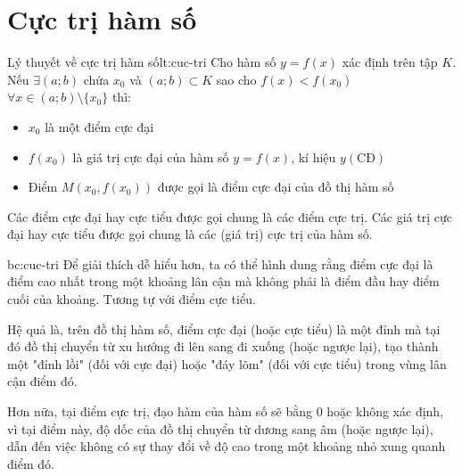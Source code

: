 \section{Cực trị hàm số}

\begin{lythuyetbox}{Lý thuyết về cực trị hàm số}{lt:cuc-tri}
Cho hàm số $y = f(x)$ xác định trên tập $K$.
Nếu $\exists (a;b)$ chứa $x_0$ và $(a;b) \subset K$ sao cho $f(x) < f(x_0)$ $\forall x \in (a;b) \setminus \{x_0\}$ thì:
\begin{itemize}
    \item $x_0$ là một điểm cực đại
    \item $f(x_0)$ là giá trị cực đại của hàm số $y = f(x)$, kí hiệu $y(\mathrm{CĐ})$
    \item Điểm $M(x_0, f(x_0))$ được gọi là điểm cực đại của đồ thị hàm số
\end{itemize}
Các điểm cực đại hay cực tiểu được gọi chung là các điểm cực trị. Các giá trị cực đại hay cực tiểu được gọi chung là các (giá trị) cực trị của hàm số.

\begin{banchat}{}{bc:cuc-tri}
Để giải thích dễ hiểu hơn, ta có thể hình dung rằng điểm cực đại là điểm cao nhất trong một khoảng lân cận mà không phải là điểm đầu hay điểm cuối của khoảng. Tương tự với điểm cực tiểu.

\vspace{1.5em}

Hệ quả là, trên đồ thị hàm số, điểm cực đại (hoặc cực tiểu) là một đỉnh mà tại đó đồ thị chuyển từ xu hướng đi lên sang đi xuống (hoặc ngược lại), tạo thành một "đỉnh lồi" (đối với cực đại) hoặc "đáy lõm" (đối với cực tiểu) trong vùng lân cận điểm đó.

\vspace{1.5em}

Hơn nữa, tại điểm cực trị, đạo hàm của hàm số sẽ bằng 0 hoặc không xác định, vì tại điểm này, độ dốc của đồ thị chuyển từ dương sang âm (hoặc ngược lại), dẫn đến việc không có sự thay đổi về độ cao trong một khoảng nhỏ xung quanh điểm đó.


\end{banchat}
\end{lythuyetbox}

